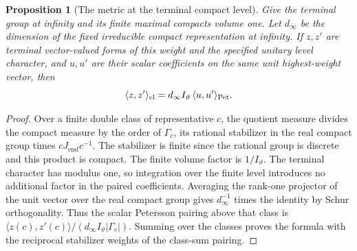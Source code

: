 \documentclass[a4paper,11pt]{article}
\newtheorem{proposition}{Proposition}[section]
\theoremstyle{definition}
\theoremstyle{remark}
\numberwithin{equation}{section}
\begin{document}
\begin{proposition}[The metric at the terminal compact level]
\leavevmode\label{prop:terminalmetric807}
Give the terminal group at infinity and its finite maximal
compacts volume one. Let \(d_\infty\) be the dimension of the
fixed irreducible compact representation at infinity. If \(z,z'\)
are terminal vector-valued forms of this weight and the specified
unitary level character, and \(u,u'\) are their scalar
coefficients on the same unit highest-weight vector, then
\[
       \langle z,z'\rangle_{\rm cl}
            =d_\infty I_\vartheta\,\langle u,u'\rangle_{\rm Pet}.
\]
\end{proposition}
\begin{proof}
Over a finite double class of representative \(c\), the quotient
measure divides the compact measure by the order of
\(\Gamma_c\), its rational stabilizer in the real compact
group times \(cJ_{\mathrm{end}}c^{-1}\). The stabilizer is
finite since the rational group is discrete and this product
is compact. The finite volume factor is \(1/I_\vartheta\).
The terminal character has modulus one, so integration over
the finite level introduces no additional factor in the paired
coefficients. Averaging the rank-one projector of the unit
vector over the real compact group gives \(d_\infty^{-1}\)
times the identity by Schur orthogonality. Thus the scalar
Petersson pairing above that class is
\(\langle z(c),z'(c)\rangle/(d_\infty I_\vartheta|\Gamma_c|)\).
Summing over the classes proves the formula with the reciprocal
stabilizer weights of the class-sum pairing.
\end{proof}
\end{document}
